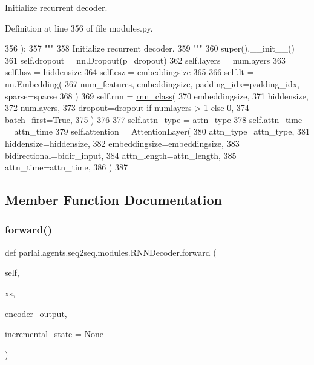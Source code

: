 \begin{DoxyVerb}Initialize recurrent decoder.
\end{DoxyVerb}
 

Definition at line 356 of file modules.\+py.


\begin{DoxyCode}
356     ):
357         \textcolor{stringliteral}{"""}
358 \textcolor{stringliteral}{        Initialize recurrent decoder.}
359 \textcolor{stringliteral}{        """}
360         super().\_\_init\_\_()
361         self.dropout = nn.Dropout(p=dropout)
362         self.layers = numlayers
363         self.hsz = hiddensize
364         self.esz = embeddingsize
365 
366         self.lt = nn.Embedding(
367             num\_features, embeddingsize, padding\_idx=padding\_idx, sparse=sparse
368         )
369         self.rnn = \hyperlink{namespaceseq2seq_1_1train_a46177da1cc74c4a2874e4a527d857f75}{rnn\_class}(
370             embeddingsize,
371             hiddensize,
372             numlayers,
373             dropout=dropout \textcolor{keywordflow}{if} numlayers > 1 \textcolor{keywordflow}{else} 0,
374             batch\_first=\textcolor{keyword}{True},
375         )
376 
377         self.attn\_type = attn\_type
378         self.attn\_time = attn\_time
379         self.attention = AttentionLayer(
380             attn\_type=attn\_type,
381             hiddensize=hiddensize,
382             embeddingsize=embeddingsize,
383             bidirectional=bidir\_input,
384             attn\_length=attn\_length,
385             attn\_time=attn\_time,
386         )
387 
\end{DoxyCode}


\subsection{Member Function Documentation}
\mbox{\label{classparlai_1_1agents_1_1seq2seq_1_1modules_1_1RNNDecoder_a883315b7f0f57ccf17c96fc8f24ddc11}} 
\subsubsection{\texorpdfstring{forward()}{forward()}}
{\footnotesize\ttfamily def parlai.\+agents.\+seq2seq.\+modules.\+R\+N\+N\+Decoder.\+forward (\begin{DoxyParamCaption}\item[{}]{self,  }\item[{}]{xs,  }\item[{}]{encoder\+\_\+output,  }\item[{}]{incremental\+\_\+state = {\ttfamily None} }\end{DoxyParamCaption})}

